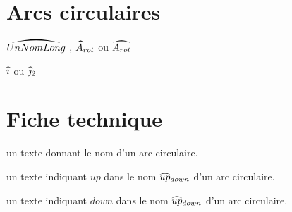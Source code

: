 \documentclass[12pt,a4paper]{article}
\begin{document}

\section{Arcs circulaires}

\newparaexample{}

\begin{latexex}
$\circarc{UnNomLong}$ ,
$\circarc*{A}{rot}$ ou
$\circarc{A_{rot}}$
\end{latexex}




\newparaexample{}

\begin{latexex}
$\circarc{i}$ ou
$\circarc*{j}{2}$
\end{latexex}




\section{Fiche technique}

 \hfill {}

\IDarg{} un texte donnant le nom d'un arc circulaire.


\separation



 un texte indiquant $up$ dans le nom $\circarc*{up}{down}$ d'un arc circulaire.

 un texte indiquant $down$ dans le nom $\circarc*{up}{down}$ d'un arc circulaire.
\end{document}
